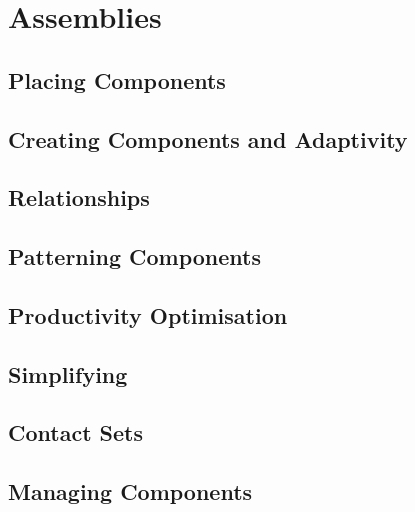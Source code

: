 \section{Assemblies}

\subsection{Placing Components}

\subsection{Creating Components and Adaptivity}

\subsection{Relationships}

\subsection{Patterning Components}

\subsection{Productivity Optimisation}

\subsection{Simplifying}

\subsection{Contact Sets}

\subsection{Managing Components}
